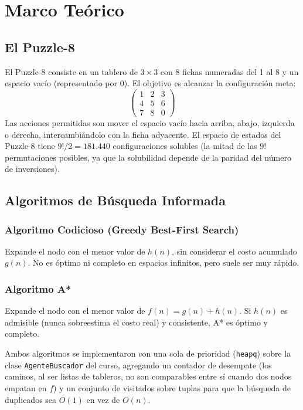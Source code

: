 \documentclass[11pt]{article}
\begin{document}
\section{Marco Teórico}

\subsection{El Puzzle-8}
El Puzzle-8 consiste en un tablero de $3\times 3$ con 8 fichas numeradas del 1
al 8 y un espacio vacío (representado por 0). El objetivo es alcanzar la
configuración meta:
\[
\begin{pmatrix} 1 & 2 & 3 \\ 4 & 5 & 6 \\ 7 & 8 & 0 \end{pmatrix}
\]
Las acciones permitidas son mover el espacio vacío hacia arriba, abajo,
izquierda o derecha, intercambiándolo con la ficha adyacente. El espacio de
estados del Puzzle-8 tiene $9!/2 = 181{.}440$ configuraciones solubles (la
mitad de las $9!$ permutaciones posibles, ya que la solubilidad depende de la
paridad del número de inversiones).

\subsection{Algoritmos de Búsqueda Informada}

\subsubsection{Algoritmo Codicioso (Greedy Best-First Search)}
Expande el nodo con el menor valor de $h(n)$, sin considerar el costo
acumulado $g(n)$. No es óptimo ni completo en espacios infinitos, pero suele
ser muy rápido.

\subsubsection{Algoritmo A*}
Expande el nodo con el menor valor de $f(n) = g(n) + h(n)$. Si $h(n)$ es
admisible (nunca sobreestima el costo real) y consistente, A* es óptimo y
completo.

Ambos algoritmos se implementaron con una cola de prioridad (\texttt{heapq})
sobre la clase \texttt{AgenteBuscador} del curso, agregando un contador de
desempate (los caminos, al ser listas de tableros, no son comparables entre sí
cuando dos nodos empatan en $f$) y un conjunto de visitados sobre tuplas para
que la búsqueda de duplicados sea $O(1)$ en vez de $O(n)$.
\end{document}
